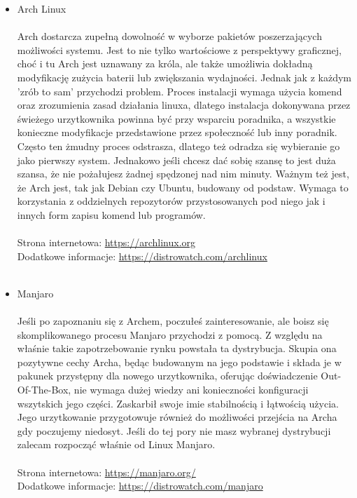 \documentclass[10pt,a4paper]{report}
\begin{document}
\begin{itemize}
\item {\Huge Arch Linux \\\\}Arch dostarcza zupełną dowolność w wyborze pakietów poszerzających możliwości systemu. Jest to nie tylko wartościowe z perspektywy graficznej, choć i tu Arch jest uznawany za króla, ale także umożliwia dokładną modyfikację zużycia baterii lub zwiększania wydajności. Jednak jak z każdym 'zrób to sam' przychodzi problem. Proces instalacji wymaga użycia komend oraz zrozumienia zasad działania linuxa, dlatego instalacja dokonywana przez świeżego urzytkownika powinna być przy wsparciu poradnika, a wszystkie konieczne modyfikacje przedstawione przez społeczność lub inny poradnik. Często ten żmudny proces odstrasza, dlatego też odradza się wybieranie go jako pierwszy system. Jednakowo jeśli chcesz dać sobię szansę to jest duża szansa, że nie pożałujesz żadnej spędzonej nad nim minuty. Ważnym też jest, że Arch jest, tak jak Debian czy Ubuntu, budowany od podstaw. Wymaga to korzystania z oddzielnych repozytorów przystosowanych pod niego jak i innych form zapisu komend lub programów. \\\\Strona internetowa: \url{https://archlinux.org}\\ Dodatkowe informacje: \href{https://distrowatch.com/table.php?distribution=arch}{https://distrowatch.com/archlinux}\\\\
\item {\Huge Manjaro \\\\} Jeśli po zapoznaniu się z Archem, poczułeś zainteresowanie, ale boisz się skomplikowanego procesu Manjaro przychodzi z pomocą. Z względu na właśnie takie zapotrzebowanie rynku powstała ta dystrybucja. Skupia ona pozytywne cechy Archa, będąc budowanym na jego podstawie i składa je w pakunek przystępny dla nowego urzytkownika, oferując doświadczenie Out-Of-The-Box, nie wymaga dużej wiedzy ani konieczności konfiguracji wszytskich jego części. Zaskarbił swoje imie stabilnością i łątwością użycia. Jego urzytkowanie przygotowuje również do możliwości przejścia na Archa gdy poczujemy niedosyt. Jeśli do tej pory nie masz wybranej dystrybucji zalecam rozpocząć właśnie od Linux Manjaro.\\\\Strona internetowa: \url{https://manjaro.org/}\\ Dodatkowe informacje: \href{https://distrowatch.com/table.php?distribution=manjaro}{https://distrowatch.com/manjaro}\\

\end{itemize}
\end{document}
